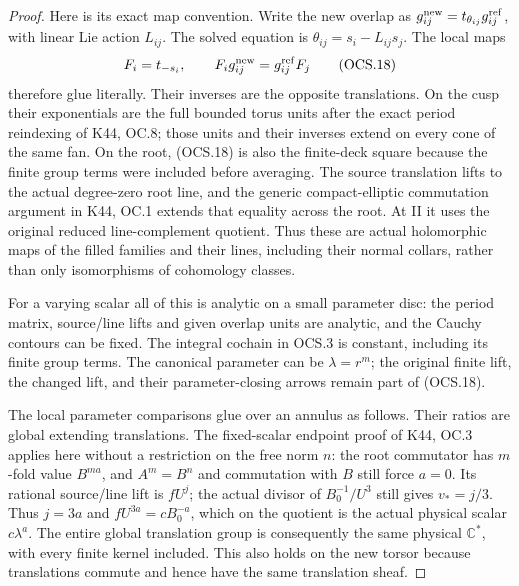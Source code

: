 \begin{proof}
Here is its exact map convention. Write the new overlap as
\(g^{\rm new}_{ij}=t_{\theta_{ij}}g^{\rm ref}_{ij}\), with
linear Lie action \(L_{ij}\). The solved equation is
\(\theta_{ij}=s_i-L_{ij}s_j\). The local maps
\[
 F_i=t_{-s_i},\qquad
                F_i g^{\rm new}_{ij}=g^{\rm ref}_{ij}F_j
\tag{OCS.18}
\]
therefore glue literally. Their inverses are the opposite
translations. On the cusp their exponentials are the full bounded
torus units after the exact period reindexing of K44, OC.8; those
units and their inverses extend on every cone of the same fan.
On the root, (OCS.18) is also the finite-deck square because the
finite group terms were included before averaging. The source
translation lifts to the actual degree-zero root line, and the
generic compact-elliptic commutation argument in K44, OC.1 extends
that equality across the root. At II it uses the original reduced
line-complement quotient. Thus these are actual holomorphic maps
of the filled families and their lines, including their normal
collars, rather than only isomorphisms of cohomology classes.

For a varying scalar all of this is analytic on a small parameter
disc: the period matrix, source/line lifts and given overlap units
are analytic, and the Cauchy contours can be fixed. The integral
cochain in OCS.3 is constant, including its finite group terms.
The canonical parameter can be \(\lambda=r^m\); the original
finite lift, the changed lift, and their parameter-closing arrows
remain part of (OCS.18).

The local parameter comparisons glue over an annulus as follows.
Their ratios are global extending translations. The fixed-scalar
endpoint proof of K44, OC.3 applies here without a restriction on
the free norm \(n\): the root commutator has \(m\)-fold value
\(B^{ma}\), and \(A^m=B^n\) and commutation with \(B\) still
force \(a=0\). Its rational source/line lift is \(fU^j\);
the actual divisor of \(B_0^{-1}/U^3\) still gives \(v_*=j/3\).
Thus \(j=3a\) and \(fU^{3a}=cB_0^{-a}\), which on the quotient
is the actual physical scalar \(c\lambda^a\). The entire global
translation group is consequently the same physical \(\mathbb C^*\),
with every finite kernel included. This also holds on the new
torsor because translations commute and hence have the same
translation sheaf.


\end{proof}
